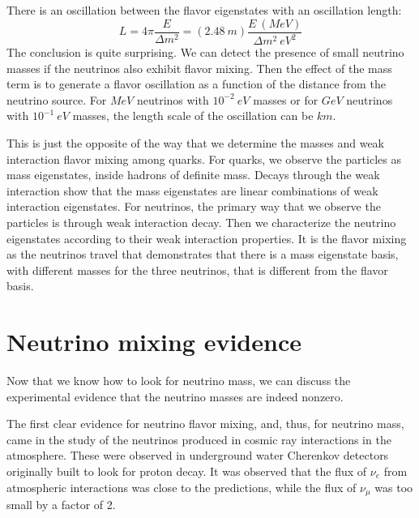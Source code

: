 \documentclass[../../main/main.tex]{subfiles}
\begin{document}


There is an oscillation between the flavor eigenstates with an oscillation length:
\begin{equation}
	L
	=
	4\pi \frac{E}{\Delta m^2}
	=
	(2.48 \ \si{m}) \frac{E \ (\si{MeV})}{\Delta m^2 \ \si{eV^2}}
	\label{eq:}
\end{equation}
The conclusion is quite surprising. We can detect the presence of small neutrino masses if the neutrinos also exhibit flavor mixing. Then the effect of the mass term is to generate a flavor oscillation as a function of the distance from the neutrino source. For \( \si{MeV} \) neutrinos with \( 10^{-2} \ \si{eV} \) masses or for \( \si{GeV} \) neutrinos with \( 10^{-1} \ \si{eV} \) masses, the length scale of the oscillation can be \( \si{km} \).

This is just the opposite of the way that we determine the masses and weak interaction flavor mixing among quarks. For quarks, we observe the particles as mass eigenstates, inside hadrons of definite mass. Decays through the weak interaction show that the mass eigenstates are linear combinations of weak interaction eigenstates. For neutrinos, the primary way that we observe the particles is through weak interaction decay. Then we characterize the neutrino eigenstates according to their weak interaction properties. It is the flavor mixing as the neutrinos travel that demonstrates that there is a mass eigenstate basis, with different masses for the three neutrinos, that is different from the flavor basis.





\section{Neutrino mixing evidence}
Now that we know how to look for neutrino mass, we can discuss the experimental evidence that the neutrino masses are indeed nonzero.

The first clear evidence for neutrino flavor mixing, and, thus, for neutrino mass, came in the study of the neutrinos produced in cosmic ray interactions in the atmosphere. These were observed in underground water Cherenkov detectors originally built to look for proton decay. It was observed that the flux of \( \nu_{e} \) from atmospheric interactions was close to the predictions, while the flux of \( \nu_{\mu} \) was too small by a factor of 2.
\end{document}
